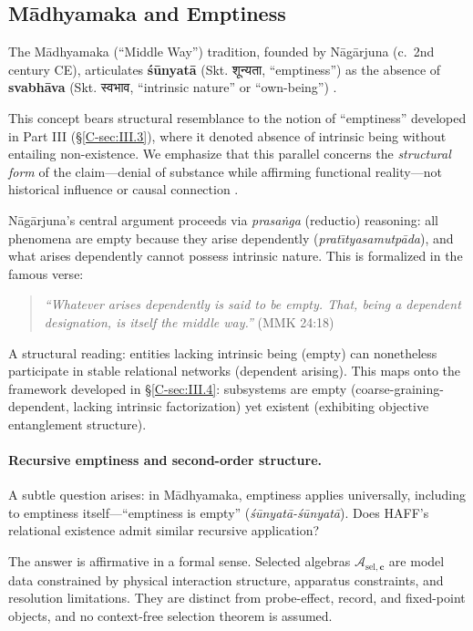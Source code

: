 \documentclass[12pt,a4paper,openany]{book}
\begin{document}
\subsection{M\=adhyamaka and Emptiness}
\label{C-sec:IV.3}

The M\=adhyamaka (``Middle Way'') tradition, founded by N\=ag\=arjuna (c.\ 2nd century CE), articulates \textbf{śūnyat\=a} (Skt. शून्यता, ``emptiness'') as the absence of \textbf{svabh\=ava} (Skt. स्वभाव, ``intrinsic nature'' or ``own-being'') \cite{Nagarjuna_MMK_Garfield1995}. 

This concept bears structural resemblance to the notion of ``emptiness'' developed in Part III (§\ref{C-sec:III.3}), where it denoted absence of intrinsic being without entailing non-existence. We emphasize that this parallel concerns the \emph{structural form} of the claim—denial of substance while affirming functional reality—not historical influence or causal connection \cite{Garfield2002,Siderits2007}.

N\=ag\=arjuna's central argument proceeds via \emph{prasaṅga} (reductio) reasoning: all phenomena are empty because they arise dependently (\emph{prat\={\i}tyasamutp\=ada}), and what arises dependently cannot possess intrinsic nature. This is formalized in the famous verse:
\begin{quote}
\emph{``Whatever arises dependently is said to be empty. That, being a dependent designation, is itself the middle way.''} (MMK 24:18) \cite{Nagarjuna_MMK_Garfield1995}
\end{quote}

A structural reading: entities lacking intrinsic being (empty) can nonetheless participate in stable relational networks (dependent arising). This maps onto the framework developed in §\ref{C-sec:III.4}: subsystems are empty (coarse-graining-dependent, lacking intrinsic factorization) yet existent (exhibiting objective entanglement structure).

\paragraph{Recursive emptiness and second-order structure.}
A subtle question arises: in M\=adhyamaka, emptiness applies universally, including to emptiness itself—``emptiness is empty'' (\emph{śūnyat\=a-śūnyat\=a}). Does HAFF's relational existence admit similar recursive application?

The answer is affirmative in a formal sense. Selected algebras $\mathcal{A}_{\mathrm{sel},\mathbf c}$ are model data constrained by physical interaction structure, apparatus constraints, and resolution limitations.  They are distinct from probe-effect, record, and fixed-point objects, and no context-free selection theorem is assumed.
\end{document}

